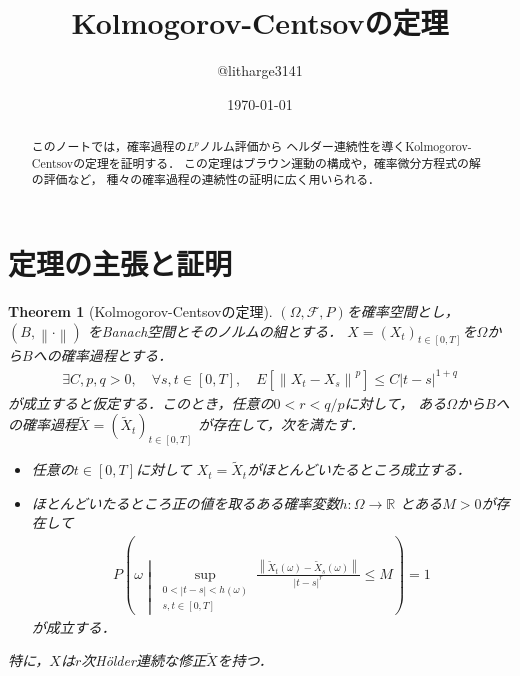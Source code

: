 \documentclass[dvipdfmx,autodetect-engine]{jsarticle}
\newtheorem{theorem}{Theorem}[section]
\theoremstyle{remark}
\theoremstyle{definition}
\newcommand{\R}{\mathbb{R}}
\newcommand{\abs}[1]{\left\lvert#1\right\rvert}
\newcommand{\norm}[1]{\left\lVert#1\right\rVert}
\newcommand{\setmid}{\mathrel{} \middle| \mathrel{}}
\begin{document}
\title{Kolmogorov-Centsovの定理}
\author{@litharge3141}
\date{\today}
\maketitle

\begin{abstract}
    このノートでは，確率過程の$L^p$ノルム評価から
    ヘルダー連続性を導くKolmogorov-Centsovの定理を証明する．
    この定理はブラウン運動の構成や，確率微分方程式の解の評価など，
    種々の確率過程の連続性の証明に広く用いられる．
\end{abstract}

\section{定理の主張と証明}
\begin{theorem}[Kolmogorov-Centsovの定理]
    $(\Omega,\mathcal{F},P)$を確率空間とし，$(B,\norm{\cdot})$
    をBanach空間とそのノルムの組とする．
    $X=(X_{t})_{t \in [0,T]}$を$\Omega$から$B$への確率過程とする．
    \begin{align}
        \exists C,p,q>0,\quad \forall s,t \in [0,T],
        \quad E[\norm{X_{t} - X_{s}}^p] \leq C \abs{t-s}^{1+q}
    \end{align}
    が成立すると仮定する．このとき，任意の$0 < r < q/p$に対して，
    ある$\Omega$から$B$への確率過程$\tilde{X}=(\tilde{X}_{t})_{t \in [0,T]}$
    が存在して，次を満たす．
    \begin{itemize}
        \item 任意の$t \in [0,T]$に対して
        $X_t = \tilde{X}_t$がほとんどいたるところ成立する．
        \item ほとんどいたるところ正の値を取るある確率変数$h\colon \Omega \to \R$
        とある$M>0$が存在して
        \begin{align}
            P\left(\omega \setmid 
            \sup_{\substack{0 < \abs{t-s} < h(\omega) \\ s,t \in [0,T]}}
            \frac{\norm{\tilde{X}_{t}(\omega) - 
            \tilde{X}_{s}(\omega)}}{\abs{t-s}^{r}} 
            \leq M
            \right)=1
        \end{align}
        が成立する．
    \end{itemize}
    特に，$X$は$r$次H\"{o}lder連続な修正$\tilde{X}$を持つ．
\end{theorem}
\end{document}
